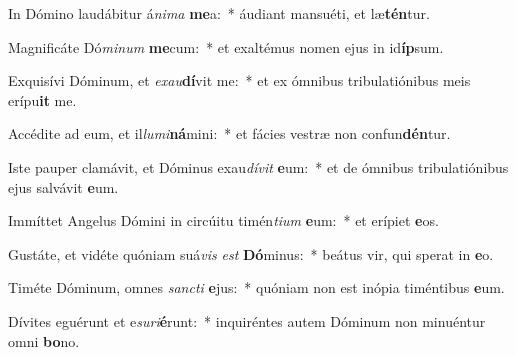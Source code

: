 \item In Dómino laudábitur á\textit{ni}\textit{ma} \textbf{me}a:~* áudiant mansuéti, et læ\textbf{tén}tur.
\item Magnificáte Dó\textit{mi}\textit{num} \textbf{me}cum:~* et exaltémus nomen ejus in id\textbf{íp}sum.
\item Exquisívi Dóminum, et \textit{ex}\textit{au}\textbf{dí}vit me:~* et ex ómnibus tribulatiónibus meis erípu\textbf{it} me.
\item Accédite ad eum, et il\textit{lu}\textit{mi}\textbf{ná}mini:~* et fácies vestræ non confun\textbf{dén}tur.
\item Iste pauper clamávit, et Dóminus exau\textit{dí}\textit{vit} \textbf{e}um:~* et de ómnibus tribulatiónibus ejus salvávit \textbf{e}um.
\item Immíttet Angelus Dómini in circúitu timén\textit{ti}\textit{um} \textbf{e}um:~* et erípiet \textbf{e}os.
\item Gustáte, et vidéte quóniam suá\textit{vis} \textit{est} \textbf{Dó}minus:~* beátus vir, qui sperat in \textbf{e}o.
\item Timéte Dóminum, omnes \textit{sanc}\textit{ti} \textbf{e}jus:~* quóniam non est inópia timéntibus \textbf{e}um.
\item Dívites eguérunt et e\textit{su}\textit{ri}\textbf{é}runt:~* inquiréntes autem Dóminum non minuéntur omni \textbf{bo}no.
